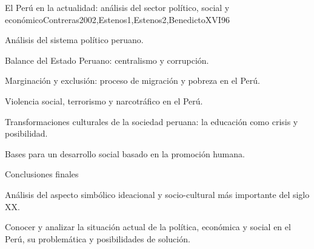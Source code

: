 \begin{syllabus}
\begin{unit}{El Perú en la actualidad: análisis del sector político, social y económico}{Contreras2002,Estenos1,Estenos2,BenedictoXVI}{9}{6}
\begin{topics}
	\item Análisis del sistema político peruano.
	\item Balance del Estado Peruano: centralismo y corrupción.
	\item Marginación y exclusión: proceso de migración y pobreza en el Perú.
	\item Violencia social, terrorismo y narcotráfico en el Perú.
	\item Transformaciones culturales de la sociedad peruana: la educación como crisis y posibilidad.
	\item Bases para un desarrollo social basado en la promoción  humana.
	\item Conclusiones finales

	\item Análisis del aspecto simbólico ideacional y socio-cultural más importante del siglo XX. 

\end{topics}
\begin{learningoutcomes}
	\item Conocer y analizar la situación actual de la política, económica y social en el Perú, su problemática y posibilidades de solución.
\end{learningoutcomes}
\end{unit}



\begin{coursebibliography}
\end{coursebibliography}
\end{syllabus}
